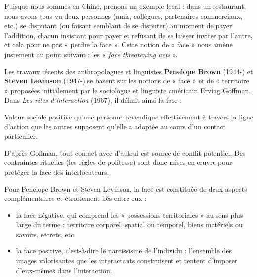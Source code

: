 Puisque nous sommes en Chine, prenons un exemple local : dans un restaurant, nous avons tous vu deux personnes (amis, collègues, partenaires commerciaux, etc.) se disputant (ou faisant semblant de se disputer) au moment de payer l’addition, chacun insistant pour payer et refusant de se laisser inviter par l’autre, et cela pour ne pas « perdre la face ». Cette notion de « face » nous amène justement au point suivant : les « \textit{face threatening acts} ».

Les travaux récents des anthropologues et linguistes \textbf{Penelope Brown} (1944-) et \textbf{Steven Levinson} (1947-) se basent sur les notions de « face » et de « territoire » proposées initialement par le sociologue et linguiste américain Erving Goffman. Dans \textit{Les rites d’interaction} (1967), il définit ainsi la face :
\begin{lecture}{}
Valeur sociale positive qu’une personne revendique effectivement à travers la ligne d’action que les autres supposent qu’elle a adoptée au cours d’un contact particulier.
\end{lecture}

\begin{samepage}
D’après Goffman, tout contact avec d’autrui est source de conflit potentiel. Des contraintes rituelles (les règles de politesse) sont donc mises en œuvre pour protéger la face des interlocuteurs.
\par\end{samepage}

Pour Penelope Brown et Steven Levinson, la face est constituée de deux aspects complémentaires et étroitement liés entre eux :
\begin{itemize}
\item la face négative, qui comprend les « possessions territoriales » au sens plus large du terme : territoire corporel, spatial ou temporel, biens matériels ou savoirs, secrets, etc.
\item la face positive, c’est-à-dire le narcissisme de l’individu : l’ensemble des images valorisantes que les interactants construisent et tentent d’imposer d’eux-mêmes dans l’interaction.
\end{itemize}

